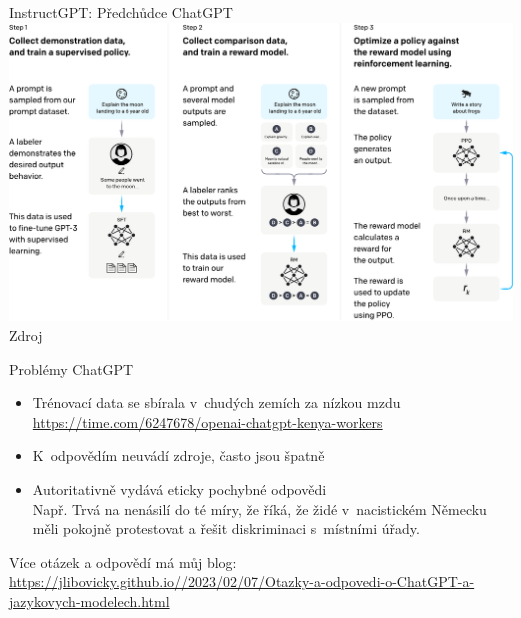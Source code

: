\documentclass[aspectratio=169,dvipsnames]{beamer}
\begin{document}

\begin{frame}{InstructGPT: Předchůdce ChatGPT}
    \centering
    \includegraphics[width=.8\textwidth]{img/instructgpt.pdf} \\
    \tiny Zdroj \citet[Figure 2]{ouyang2022instruct}
\end{frame}


\begin{frame}{Problémy ChatGPT}

    \begin{itemize}

        \item Trénovací data se sbírala v~chudých zemích za nízkou mzdu {\tiny \\
            \url{https://time.com/6247678/openai-chatgpt-kenya-workers}}

        \item K~odpovědím neuvádí zdroje, často jsou špatně

        \item Autoritativně vydává eticky pochybné odpovědi \\ {\footnotesize Např. Trvá na nenásilí do té míry, že říká, že židé
            v~nacistickém Německu měli pokojně protestovat a řešit diskriminaci
            s~místními úřady.}

    \end{itemize}

    \vspace{10pt}

    Více otázek a odpovědí má můj blog: \url{https://jlibovicky.github.io//2023/02/07/Otazky-a-odpovedi-o-ChatGPT-a-jazykovych-modelech.html}

\end{frame}
\end{document}
